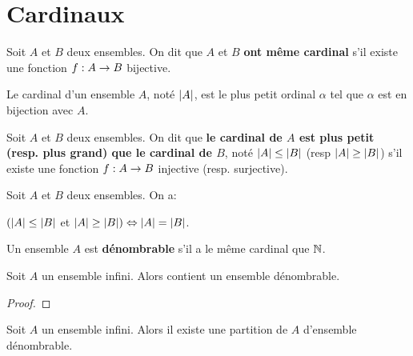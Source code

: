 \chapter{Cardinaux}


\begin{definition}
	Soit $A$ et $B$ deux ensembles.
	On dit que $A$ et $B$ \textbf{ont même cardinal} s'il existe une fonction
	$f : A \rightarrow B$ bijective.
\end{definition}

\begin{definition}
	Le cardinal d'un ensemble $A$, noté $|A|$, est le plus petit ordinal
	$\alpha$ tel que $\alpha$ est en bijection avec $A$.
\end{definition}

\begin{definition}
	Soit $A$ et $B$ deux ensembles. On dit que \textbf{le cardinal de $A$ est
	plus petit (resp. plus grand) que le cardinal de $B$}, noté $|A| \leq
	|B|$ (resp $|A| \geq |B|$) s'il existe une fonction
	$f : A \rightarrow B$ injective (resp. surjective).
\end{definition}

\begin{theorem} 
	Soit $A$ et $B$ deux ensembles. On a:

	$(|A| \leq |B|$ et $|A| \geq |B|) \Leftrightarrow |A| =
	|B|$.
	\label{thm:csb}
\end{theorem}
\begin{definition}
	Un ensemble $A$ est \textbf{dénombrable} s'il a le même cardinal que
	$\mathbb{N}$.
\end{definition}

\begin{proposition}
	Soit $A$ un ensemble infini. Alors contient un ensemble dénombrable.
\end{proposition}

\ifdefined\outputproof
\begin{proof}

\end{proof}
\fi

\begin{proposition}
	\label{prop:infinite_set_partition}
	Soit $A$ un ensemble infini. Alors il existe une partition de $A$ d'ensemble
	dénombrable.
\end{proposition}

